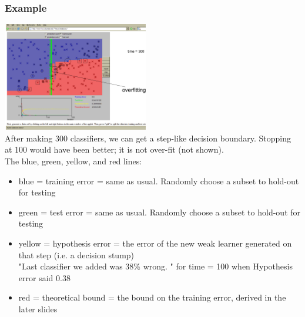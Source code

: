 \subsubsection{Example}
\includegraphics[width=2.5in]{figures/bagging_example.pdf}  \hfill \\
After making 300 classifiers, we can get a step-like decision boundary.  
Stopping at 100 would have been better; it is not over-fit (not shown).  \hfill \\

The blue, green, yellow, and red lines:   %
\begin{itemize}
	\item blue = training error = same as usual.  Randomly choose a subset to hold-out for testing
	\item green = test error = same as usual.  Randomly choose a subset to hold-out for testing
	\item yellow = hypothesis error = the error of the new weak learner generated on that step 
			(i.e. a decision stump) \hfill \\
		"Last classifier we added was 38\% wrong. " 
		for time = 100 when Hypothesis error said 0.38
	\item red = theoretical bound = the bound on the training error, derived in the later slides
\end{itemize}

